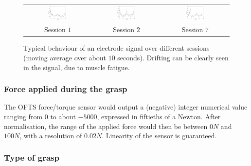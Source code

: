 \begin{figure}[!ht] \centering
  \begin{tabular}{ccc}
    \includegraphics[width=0.32\textwidth]{figs/el8_movingAvg_s1} &
    \includegraphics[width=0.32\textwidth]{figs/el8_movingAvg_s2} &
    \includegraphics[width=0.32\textwidth]{figs/el8_movingAvg_s7} \\
    Session $1$ & Session $2$ & Session $7$ \\
  \end{tabular}
  \caption{Typical behaviour of an electrode signal over different
  sessions (moving average over about $10$ seconds). Drifting can be
  clearly seen in the signal, due to muscle fatigue.}
  \label{fig:drift}
\end{figure}

\subsubsection{Force applied during the grasp}

The OFTS force/torque sensor would output a (negative) integer
numerical value ranging from $0$ to about $-5000$, expressed in
fiftieths of a Newton. After normalisation, the range of the applied
force would then be between $0N$ and $100N$, with a resolution of
$0.02N$. Linearity of the sensor is guaranteed.

\subsubsection{Type of grasp}

